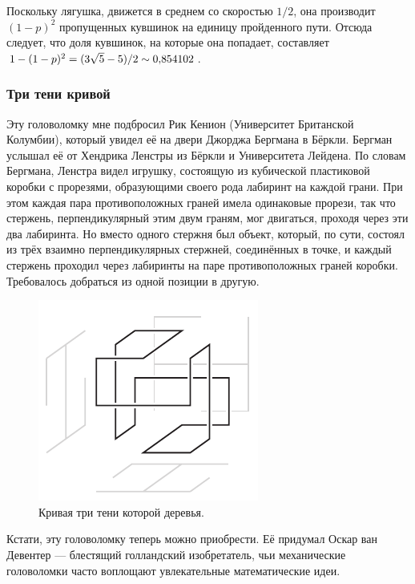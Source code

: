 Поскольку лягушка, движется в среднем со скоростью $1/2$, она производит $(1 - p)^2$ пропущенных кувшинок на единицу пройденного пути.
Отсюда следует, что доля кувшинок, на которые она попадает, составляет $1 - (1 - p)^2 \z= (3\sqrt5 - 5) / 2 \sim 0{,}854102$.

\subsubsection*{Три тени кривой}

Эту головоломку мне подбросил Рик Кенион (Университет Британской Колумбии), который увидел её на двери Джорджа Бергмана в Бёркли. 
Бергман услышал её от Хендрика Ленстры из Бёркли и Университета Лейдена.
По словам Бергмана, Ленстра видел игрушку, состоящую из кубической пластиковой коробки с прорезями, образующими своего рода лабиринт на каждой грани.
При этом каждая пара противоположных граней имела одинаковые прорези, так что стержень, перпендикулярный этим двум граням, мог двигаться, проходя через эти два лабиринта.
Но вместо одного стержня был объект, который, по сути, состоял из трёх взаимно перпендикулярных стержней, соединённых в точке, и каждый стержень проходил через лабиринты на паре противоположных граней коробки.
Требовалось добраться из одной позиции в другую.

\begin{figure}[b!]
\centering
\includegraphics[scale=1]{pics/tree3}
\caption{Кривая три тени которой деревья.}
\label{pic:tree3}
\end{figure}

Кстати, эту головоломку теперь можно приобрести.
Её придумал Оскар ван Девентер --- блестящий голландский изобретатель, чьи механические головоломки часто воплощают увлекательные математические идеи.

